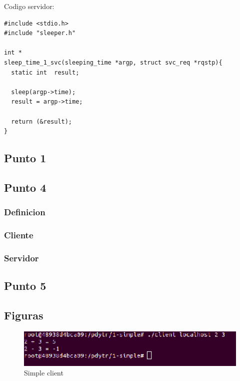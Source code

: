 \documentclass[12pt,journal,compsoc]{IEEEtran}
\begin{document}
Codigo servidor: 
\begin{lstlisting}
#include <stdio.h>
#include "sleeper.h"

int *
sleep_time_1_svc(sleeping_time *argp, struct svc_req *rqstp){
  static int  result;

  sleep(argp->time);
  result = argp->time;
  
  return (&result);
}
\end{lstlisting}

\newpage
\onecolumn
{}
\subsection{Punto 1}
\label{local-procedures}


\subsection{Punto 4}
\subsubsection{Definicion}
\label{punto-4-definicion}


\subsubsection{Cliente}
\label{punto-4-cliente}



\subsubsection{Servidor}
\label{punto-4-servidor}


\subsection{Punto 5}

\label{50-times-client}


\subsection{Figuras}

\begin{figure}[H]
\centering
\includegraphics[width=125mm]{capturas/1-simple-client.png}
\caption{Simple client}
\label{fig:1-simple-client}
\end{figure}
\end{document}
